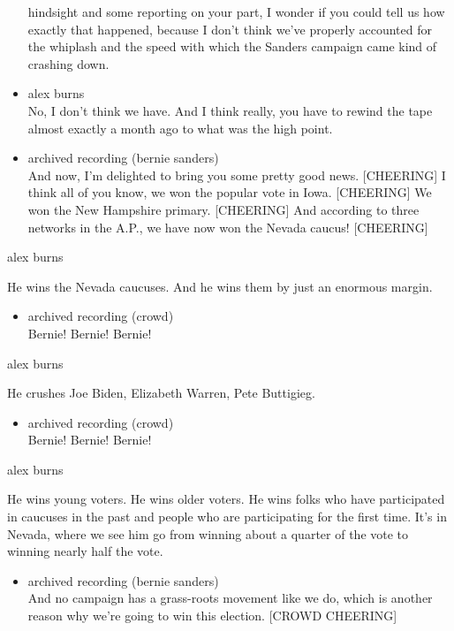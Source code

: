 \begin{itemize}
  hindsight and some reporting on your part, I wonder if you could tell
  us how exactly that happened, because I don't think we've properly
  accounted for the whiplash and the speed with which the Sanders
  campaign came kind of crashing down.
\item
  alex burns\\
  No, I don't think we have. And I think really, you have to rewind the
  tape almost exactly a month ago to what was the high point.
\item
  archived recording (bernie sanders)\\
  And now, I'm delighted to bring you some pretty good news.
  {[}CHEERING{]} I think all of you know, we won the popular vote in
  Iowa. {[}CHEERING{]} We won the New Hampshire primary. {[}CHEERING{]}
  And according to three networks in the A.P., we have now won the
  Nevada caucus! {[}CHEERING{]}
\end{itemize}

alex burns

He wins the Nevada caucuses. And he wins them by just an enormous
margin.

\begin{itemize}
\tightlist
\item
  archived recording (crowd)\\
  Bernie! Bernie! Bernie!
\end{itemize}

alex burns

He crushes Joe Biden, Elizabeth Warren, Pete Buttigieg.

\begin{itemize}
\tightlist
\item
  archived recording (crowd)\\
  Bernie! Bernie! Bernie!
\end{itemize}

alex burns

He wins young voters. He wins older voters. He wins folks who have
participated in caucuses in the past and people who are participating
for the first time. It's in Nevada, where we see him go from winning
about a quarter of the vote to winning nearly half the vote.

\begin{itemize}
\tightlist
\item
  archived recording (bernie sanders)\\
  And no campaign has a grass-roots movement like we do, which is
  another reason why we're going to win this election. {[}CROWD
  CHEERING{]}
\end{itemize}

